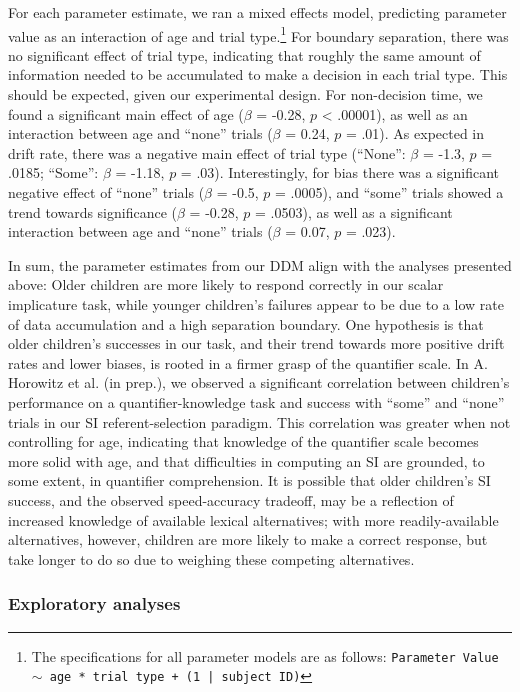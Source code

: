 \documentclass[10pt, letterpaper]{article}
\begin{document}
For each parameter estimate, we ran a mixed effects model, predicting
parameter value as an interaction of age and trial
type.\footnote{The specifications for all parameter models are as follows: \texttt{Parameter Value $\sim$ age * trial type + (1 | subject ID)}}
For boundary separation, there was no significant effect of trial type,
indicating that roughly the same amount of information needed to be
accumulated to make a decision in each trial type. This should be
expected, given our experimental design. For non-decision time, we found
a significant main effect of age (\(\beta\) = -0.28, \(p\) \textless{}
.00001), as well as an interaction between age and ``none'' trials
(\(\beta\) = 0.24, \(p\) = .01). As expected in drift rate, there was a
negative main effect of trial type (``None'': \(\beta\) = -1.3, \(p\) =
.0185; ``Some'': \(\beta\) = -1.18, \(p\) = .03). Interestingly, for
bias there was a significant negative effect of ``none'' trials
(\(\beta\) = -0.5, \(p\) = .0005), and ``some'' trials showed a trend
towards significance (\(\beta\) = -0.28, \(p\) = .0503), as well as a
significant interaction between age and ``none'' trials (\(\beta\) =
0.07, \(p\) = .023).

In sum, the parameter estimates from our DDM align with the analyses
presented above: Older children are more likely to respond correctly in
our scalar implicature task, while younger children's failures appear to
be due to a low rate of data accumulation and a high separation
boundary. One hypothesis is that older children's successes in our task,
and their trend towards more positive drift rates and lower biases, is
rooted in a firmer grasp of the quantifier scale. In A. Horowitz et al.
(in prep.), we observed a significant correlation between children's
performance on a quantifier-knowledge task and success with ``some'' and
``none'' trials in our SI referent-selection paradigm. This correlation
was greater when not controlling for age, indicating that knowledge of
the quantifier scale becomes more solid with age, and that difficulties
in computing an SI are grounded, to some extent, in quantifier
comprehension. It is possible that older children's SI success, and the
observed speed-accuracy tradeoff, may be a reflection of increased
knowledge of available lexical alternatives; with more readily-available
alternatives, however, children are more likely to make a correct
response, but take longer to do so due to weighing these competing
alternatives.

\subsubsection{Exploratory analyses}\label{exploratory-analyses}
\end{document}
